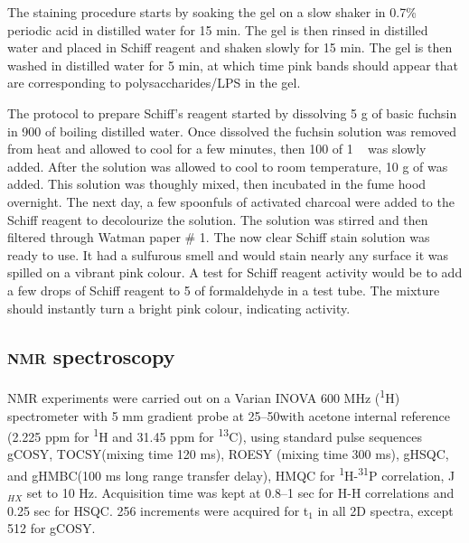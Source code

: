     The staining procedure starts by soaking the gel on a slow shaker in 0.7\% periodic acid in
    distilled water for 15 min. The gel is then rinsed in distilled water and placed in Schiff reagent
    and shaken slowly for 15 min. The gel is then washed in distilled water for 5 min, at which time
    pink bands should appear that are corresponding to polysaccharides/\ac{LPS} in the gel.

    The protocol to prepare Schiff's reagent started by dissolving 5 \si{\gram} of basic fuchsin in
    900 \millilitre of boiling distilled water. Once dissolved the fuchsin solution was removed from
    heat and allowed to cool for a few minutes, then 100 \millilitre of 1 \si{\molar}\  was
    slowly added. After the solution was allowed to cool to room temperature, 10 \si{\gram} of
     was added. This solution was thoughly mixed, then incubated in the fume hood
    overnight. The next day, a few spoonfuls of activated charcoal were added to the Schiff reagent to
    decolourize the solution. The solution was stirred and then filtered through Watman paper \# 1. The
    now clear Schiff stain solution was ready to use. It had a sulfurous smell and would stain nearly
    any surface it was spilled on a vibrant pink colour. A test for Schiff reagent activity would be
    to add a few drops of Schiff reagent to 5 \millilitre of formaldehyde in a test tube. The mixture
    should instantly turn a bright pink colour, indicating activity.

    \subsection{\textsc{nmr} spectroscopy} %
    \label{sub:nmr_spectroscopy}

    \Ac{NMR} experiments were carried out on a Varian INOVA 600 \si{\mega\hertz}
    (\textsuperscript{1}H) spectrometer with 5 \si{\milli\meter} gradient probe at 25--50\cel with
acetone internal reference (2.225 ppm for \textsuperscript{1}H and 31.45 ppm for
\textsuperscript{13}C), using standard pulse sequences \ac{gCOSY}, \ac{TOCSY}(mixing time 120
\si{\milli\second}), \ac{ROESY} (mixing time 300 \si{\milli\second}), \ac{gHSQC}, and
\ac{gHMBC}(100 \si{\milli\second} long range transfer delay), \ac{HMQC} for
\textsuperscript{1}H-\textsuperscript{31}P correlation, J$_{HX}$ set to 10
\si{\hertz}. Acquisition time was kept at 0.8--1 sec for H-H correlations and 0.25 sec for
\ac{HSQC}. 256 increments were acquired for t$_1$ in all 2D spectra, except 512 for \ac{gCOSY}.

